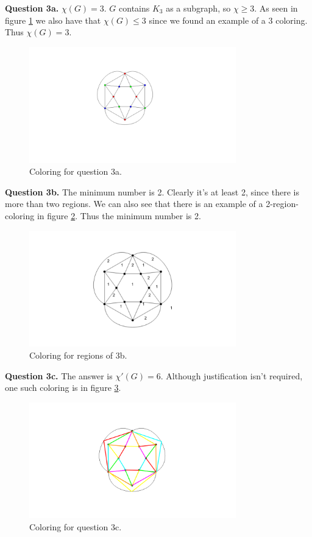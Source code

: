 \documentclass[letterpaper, reqno,11pt]{article}
\begin{document}
{\medskip\noindent\bf Question 3a.} $\chi(G)=3$. $G$ contains $K_3$ as a subgraph, so $\chi\geq 3$. As seen in figure \ref{fig:3a} we also have that $\chi(G)\leq 3$ since we found an example of a 3 coloring. Thus $\chi(G)=3$.

\begin{figure}[htpb]
    \centering
    \includegraphics[width=0.8\textwidth]{3a}
    \caption{Coloring for question 3a.}
    \label{fig:3a}
\end{figure}

{\medskip\noindent\bf Question 3b.} The minimum number is 2. Clearly it's at least 2, since there is more than two regions. We can also see that there is an example of a 2-region-coloring in figure \ref{fig:3b}. Thus the minimum number is 2.

\begin{figure}[htpb]
    \centering
    \includegraphics[width=0.8\textwidth]{3b}
    \caption{Coloring for regions of 3b.}
    \label{fig:3b}
\end{figure}

{\medskip\noindent\bf Question 3c.} The answer is $\chi'(G)=6$. Although justification isn't required, one such coloring is in figure \ref{fig:3c}.

\begin{figure}[htpb]
    \centering
    \includegraphics[width=0.8\textwidth]{3c}
    \caption{Coloring for question 3c.}
    \label{fig:3c}
\end{figure}
\end{document}
